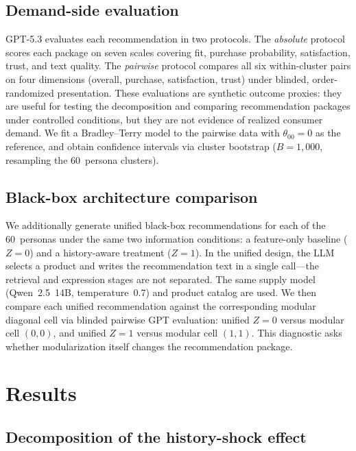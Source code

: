 \documentclass[11pt]{article}
\begin{document}
\subsection{Demand-side evaluation}

GPT-5.3 evaluates each recommendation in two protocols. The \emph{absolute} protocol scores each package on seven scales covering fit, purchase probability, satisfaction, trust, and text quality. The \emph{pairwise} protocol compares all six within-cluster pairs on four dimensions (overall, purchase, satisfaction, trust) under blinded, order-randomized presentation. These evaluations are synthetic outcome proxies: they are useful for testing the decomposition and comparing recommendation packages under controlled conditions, but they are not evidence of realized consumer demand. We fit a Bradley--Terry model to the pairwise data with $\theta_{00} = 0$ as the reference, and obtain confidence intervals via cluster bootstrap ($B = 1{,}000$, resampling the 60~persona clusters).

\subsection{Black-box architecture comparison}

We additionally generate unified black-box recommendations for each of the 60~personas under the same two information conditions: a feature-only baseline ($Z = 0$) and a history-aware treatment ($Z = 1$). In the unified design, the LLM selects a product and writes the recommendation text in a single call---the retrieval and expression stages are not separated. The same supply model (Qwen~2.5~14B, temperature~0.7) and product catalog are used. We then compare each unified recommendation against the corresponding modular diagonal cell via blinded pairwise GPT evaluation: unified $Z = 0$ versus modular cell $(0,0)$, and unified $Z = 1$ versus modular cell $(1,1)$. This diagnostic asks whether modularization itself changes the recommendation package.

\section{Results}\label{section:results}

\subsection{Decomposition of the history-shock effect}
\end{document}
